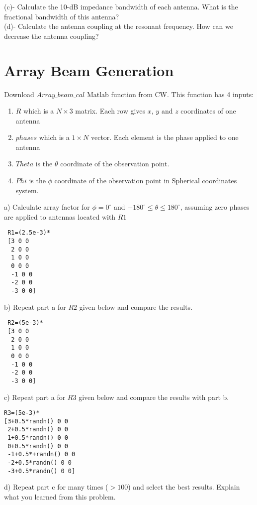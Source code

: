 \documentclass[paper=a4, fontsize=11pt]{scrartcl} %
\numberwithin{equation}{section} %
\numberwithin{figure}{section} %
\numberwithin{table}{section} %
\begin{document}
(c)- Calculate the 10-dB impedance bandwidth of each antenna. What is the fractional bandwidth of this antenna?\\

(d)- Calculate the antenna coupling at the resonant frequency. How can we decrease the antenna coupling?

\section{Array Beam Generation} 
Download $Array\_beam\_cal$ Matlab function from CW.
This function has 4 inputs:
 \begin{enumerate} 
  \item $R$ which is a $N\times3$ matrix. Each row gives $x$, $y$ and $z$ coordinates of one antenna
  \item $phases$ which is a $1\times N$ vector. Each element is the phase applied to one antenna
  \item $Theta$ is the $\theta$ coordinate of the observation point.
   \item $Phi$ is the $\phi$ coordinate of the observation point in Spherical coordinates system.
\end{enumerate}
a) Calculate array factor for $\phi=0^\circ$ and $-180 ^\circ \leq \theta \leq 180^\circ$, assuming zero phases are applied to antennas located with $R1$
\begin{lstlisting}
 R1=(2.5e-3)*
 [3 0 0
  2 0 0
  1 0 0
  0 0 0
  -1 0 0
  -2 0 0
  -3 0 0]
\end{lstlisting}
b) Repeat part a for $R2$ given below and compare the results.
\begin{lstlisting}
 R2=(5e-3)*
 [3 0 0
  2 0 0
  1 0 0
  0 0 0
  -1 0 0
  -2 0 0
  -3 0 0]
\end{lstlisting}

c) Repeat part a for $R3$ given below and compare the results with part b.
\begin{lstlisting}
R3=(5e-3)*
[3+0.5*randn() 0 0
 2+0.5*randn() 0 0
 1+0.5*randn() 0 0
 0+0.5*randn() 0 0
 -1+0.5*+randn() 0 0
 -2+0.5*randn() 0 0
 -3+0.5*randn() 0 0]
    \end{lstlisting}
d) Repeat part c for many times ($ > 100$) and select the best results. Explain what you learned from this problem.
\end{document}
